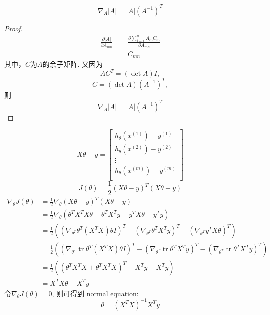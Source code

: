 \documentclass[UTF8]{ctexart}
\DeclareMathOperator{\tr}{tr}
\newtheorem{proof}{证明}[section]
\begin{document}
	\begin{equation*}
		\nabla_A{|A|} = |A|(A^{-1})^T
	\end{equation*}
	\begin{proof}
		\begin{equation*}
		\begin{aligned}
		\frac{\partial |A|}{\partial A_{mn}} & = \frac{\partial \sum\limits_{i=1}^{n}A_{in}C_{in}}{\partial A_{mn}} \\
		& = C_{mn}
		\end{aligned}
		\end{equation*}
		其中，$C$为$A$的余子矩阵. 又因为
		\begin{equation*}
			AC^T = (\det A) I,
		\end{equation*}
		\begin{equation*}
			C = (\det A) (A^{-1})^T, 
		\end{equation*}
		则
		\begin{equation*}
			\nabla_A{|A|} = |A|(A^{-1})^T 
		\end{equation*}
	\end{proof}

	\begin{equation*}
		X\theta - y = 
		\left[
			\begin{matrix}
			h_\theta(x^{(1)})-y^{(1)} \\
			h_\theta(x^{(2)})-y^{(2)} \\
			\vdots \\
			h_\theta(x^{(m)})-y^{(m)} \\
			\end{matrix}
		\right]
	\end{equation*}
	\begin{equation*}
		J(\theta) = \frac{1}{2} (X\theta - y)^T(X\theta - y)
	\end{equation*}
	\begin{equation*}
		\begin{aligned}
			\nabla_\theta J(\theta) & = \frac{1}{2} \nabla_\theta (X\theta - y)^T(X\theta - y) \\
			& = \frac{1}{2}\nabla_\theta (\theta^TX^TX\theta-\theta^TX^Ty-y^TX\theta+y^Ty) \\
			& = \frac{1}{2}((\nabla_{\theta^T} \theta^T(X^TX)\theta I)^T-(\nabla_{\theta^T} \theta^TX^Ty)^T -(\nabla_{\theta^T} y^TX\theta)^T) \\
			& = \frac{1}{2}((\nabla_{\theta^T} \tr \theta^T(X^TX)\theta I)^T-(\nabla_{\theta^T} \tr \theta^TX^Ty)^T -(\nabla_{\theta^T} \tr \theta^TX^Ty)^T) \\
			& = \frac{1}{2}((\theta^TX^TX + \theta^TX^TX)^T - X^Ty - X^Ty) \\
			& = X^TX\theta - X^Ty
		\end{aligned}		
	\end{equation*}
	令$\nabla_\theta J(\theta)=0$, 则可得到 normal equation:
	\begin{equation*}
		\theta = (X^TX)^{-1}X^Ty
	\end{equation*}
	
\end{document}
